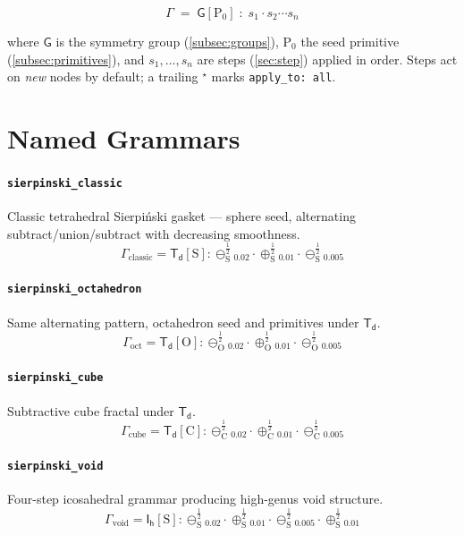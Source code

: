 \documentclass[11pt, a4paper]{article}
\newcommand{\G}[1]{\mathsf{#1}}
\newcommand{\prim}[1]{\mathrm{#1}}
\newcommand{\sub}{\ominus}
\newcommand{\add}{\oplus}
\newcommand{\half}{\tfrac{1}{2}}
\newcommand{\code}[1]{\texttt{#1}}
\begin{document}
\[
  \boxed{\;
    \Gamma \;=\; \G{G}[\prim{P_0}] \;:\; s_1 \cdot s_2 \cdots s_n
  \;}
\]

where $\G{G}$ is the symmetry group (\autoref{subsec:groups}),
$\prim{P_0}$ the seed primitive (\autoref{subsec:primitives}),
and $s_1, \ldots, s_n$ are steps (\autoref{sec:step}) applied in order.
Steps act on \emph{new} nodes by default; a trailing ${}^{\!\star}$
marks \code{apply\_to: all}.

\section{Named Grammars}
\label{sec:named}

\paragraph{\code{sierpinski\_classic}}
Classic tetrahedral Sierpi\'nski gasket — sphere seed, alternating
subtract/union/subtract with decreasing smoothness.
\[
  \Gamma_{\mathrm{classic}}
  = \G{T_d}[\prim{S}]
  : \sub_{\prim{S}}^{\half}{}_{\!0.02}
  \cdot \add_{\prim{S}}^{\half}{}_{\!0.01}
  \cdot \sub_{\prim{S}}^{\half}{}_{\!0.005}
\]

\paragraph{\code{sierpinski\_octahedron}}
Same alternating pattern, octahedron seed and primitives under $\G{T_d}$.
\[
  \Gamma_{\mathrm{oct}}
  = \G{T_d}[\prim{O}]
  : \sub_{\prim{O}}^{\half}{}_{\!0.02}
  \cdot \add_{\prim{O}}^{\half}{}_{\!0.01}
  \cdot \sub_{\prim{O}}^{\half}{}_{\!0.005}
\]

\paragraph{\code{sierpinski\_cube}}
Subtractive cube fractal under $\G{T_d}$.
\[
  \Gamma_{\mathrm{cube}}
  = \G{T_d}[\prim{C}]
  : \sub_{\prim{C}}^{\half}{}_{\!0.02}
  \cdot \add_{\prim{C}}^{\half}{}_{\!0.01}
  \cdot \sub_{\prim{C}}^{\half}{}_{\!0.005}
\]

\paragraph{\code{sierpinski\_void}}
Four-step icosahedral grammar producing high-genus void structure.
\[
  \Gamma_{\mathrm{void}}
  = \G{I_h}[\prim{S}]
  : \sub_{\prim{S}}^{\half}{}_{\!0.02}
  \cdot \add_{\prim{S}}^{\half}{}_{\!0.01}
  \cdot \sub_{\prim{S}}^{\half}{}_{\!0.005}
  \cdot \add_{\prim{S}}^{\half}{}_{\!0.01}
\]
\end{document}
